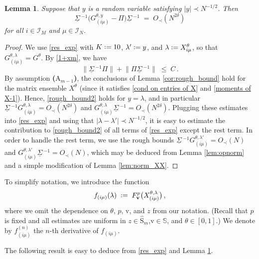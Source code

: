\documentclass[11pt]{article} %
\numberwithin{equation}{section}
\numberwithin{figure}{section}
\theoremstyle{plain} %
\newtheorem{lemma}[theorem]{Lemma}
\theoremstyle{definition} %
\newcommand{\f}[1]{\boldsymbol{\mathrm{#1}}} %
\newcommand{\bb}{\mathbb} %
\renewcommand{\cal}{\mathcal}
\newcommand{\ul}[1]{\underline{#1} \!\,} %
\newcommand{\wh}{\widehat}
\newcommand*{\deq}{\mathrel{\vcenter{\baselineskip0.65ex \lineskiplimit0pt \hbox{.}\hbox{.}}}=}
\renewcommand{\leq}{\leqslant}
\newcommand{\pb}[1]{\bigl({#1}\bigr)}
\newcommand{\abs}[1]{\lvert #1 \rvert}
\newcommand{\norm}[1]{\lVert #1 \rVert}
\begin{document}
\begin{lemma} \label{lem:rough bound}
Suppose that $y$ is a random variable satisfying $\abs{y} \prec N^{-1/2}$. Then
\begin{equation} \label{rough_bound2}
\ul \Sigma^{-1} \pb{G^{\theta, y}_{(i \mu)} - \Pi} \ul \Sigma^{-1} \;=\; O_\prec(N^{2 \delta})
\end{equation}
for all $i \in \cal I_M$ and $\mu \in \cal I_N$.
\end{lemma}
\begin{proof}
We use \eqref{res_exp} with $K \deq 10$, $\lambda' \deq y$, and $\lambda \deq X_{i \mu}^\theta$, so that $G_{(i \mu)}^{\theta, \lambda} = G^\theta$.
By \eqref{1+xm}, we have
\begin{equation} \label{Pi_bounded}
\norm{\ul \Sigma^{-1} \Pi} + \norm{\Pi \ul \Sigma^{-1}} \;\leq\; C\,.
\end{equation}
By assumption \textbf{($\f A_{m - 1}$)}, the conclusions of Lemma \ref{cor:rough_bound} hold for the matrix ensemble $X^\theta$ (since it satisfies \eqref{cond on entries of X} and \eqref{moments of X-1}). Hence, \eqref{rough_bound2} holds for $y = \lambda$, and in particular $\ul \Sigma^{-1} G_{(i \mu)}^{\theta, \lambda} = O_\prec(N^{2 \delta})$ and $G_{(i \mu)}^{\theta, \lambda} \ul \Sigma^{-1} = O_\prec(N^{2 \delta})$. Plugging these estimates into \eqref{res_exp} and using that $\abs{\lambda - \lambda'} \prec N^{-1/2}$, it is easy to estimate the contribution to \eqref{rough_bound2} of all terms of \eqref{res_exp} except the rest term. In order to handle the rest term, we use the rough bounds $\ul \Sigma^{-1} G_{(i \mu)}^{\theta, \lambda'} = O_\prec(N)$ and $G_{(i \mu)}^{\theta, \lambda'} \ul \Sigma^{-1} = O_\prec(N)$, which may be deduced from Lemma \ref{lem:opnorm} and a simple modification of Lemma \ref{lem:norm_XX}.
\end{proof}


To simplify notation, we introduce the function
\begin{equation} \label{def_f}
f_{(i \mu)}(\lambda) \;\deq\; F_{\f v}^p\pb{X_{(i \mu)}^{\theta, \lambda}}\,,
\end{equation}
where we omit the dependence on $\theta$, $p$, $\f v$, and $z$ from our notation. (Recall that $p$ is fixed and all estimates are uniform in $z \in \wh {\f S}_m$,$\f v \in \bb S$, and $\theta \in [0,1]$.) We denote by $f^{(n)}_{(i \mu)}$ the $n$-th derivative of $f_{(i \mu)}$.

The following result is easy to deduce from \eqref{res_exp} and Lemma \ref{lem:rough bound}.
\end{document}
